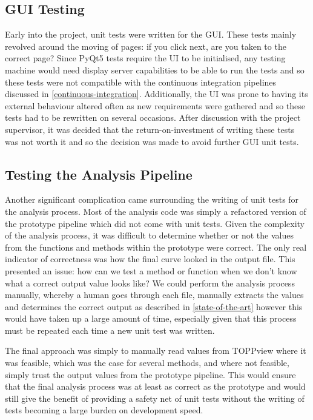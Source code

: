 \documentclass{l4proj}
\begin{document}
\subsection{GUI Testing}\label{gui-testing}
Early into the project, unit tests were written for the GUI. These tests mainly revolved around the moving of pages: if you click next, are you taken to the correct page? Since PyQt5 tests require the UI to be initialised, any testing machine would need display server capabilities to be able to run the tests and so these tests were not compatible with the continuous integration pipelines discussed in \ref{continuous-integration}. Additionally, the UI was prone to having its external behaviour altered often as new requirements were gathered and so these tests had to be rewritten on several occasions. After discussion with the project supervisor, it was decided that the return-on-investment of writing these tests was not worth it and so the decision was made to avoid further GUI unit tests.

\subsection{Testing the Analysis Pipeline}
Another significant complication came surrounding the writing of unit tests for the analysis process. Most of the analysis code was simply a refactored version of the prototype pipeline which did not come with unit tests. Given the complexity of the analysis process, it was difficult to determine whether or not the values from the functions and methods within the prototype were correct. The only real indicator of correctness was how the final curve looked in the output file. This presented an issue: how can we test a method or function when we don't know what a correct output value looks like? We could perform the analysis process manually, whereby a human goes through each file, manually extracts the values and determines the correct output as described in \ref{state-of-the-art} however this would have taken up a large amount of time, especially given that this process must be repeated each time a new unit test was written.

The final approach was simply to manually read values from TOPPview where it was feasible, which was the case for several methods, and where not feasible, simply trust the output values from the prototype pipeline. This would ensure that the final analysis process was at least as correct as the prototype and would still give the benefit of providing a safety net of unit tests without the writing of tests becoming a large burden on development speed.
\end{document}
